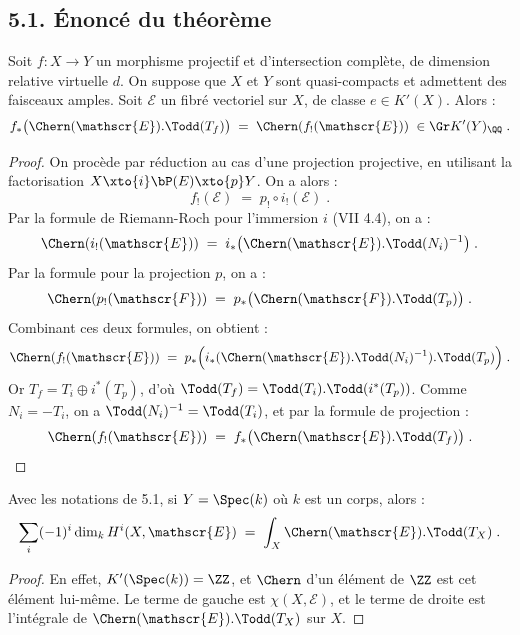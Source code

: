 \subsection*{5.1. Énoncé du théorème}

\begin{theoreme}[5.1]%
Soit $f : X \to Y$ un morphisme projectif et d'intersection complète, de dimension relative virtuelle $d$. On suppose que $X$ et $Y$ sont quasi-compacts et admettent des faisceaux amples. Soit $\mathscr{E}$ un fibré vectoriel sur $X$, de classe $e \in K'(X)$. Alors :
\[
f_*\bigl(\Chern(\mathscr{E}) . \Todd(T_f)\bigr) \; = \; \Chern(f_!(\mathscr{E}))\; \in \Gr K'(Y)_{\QQ}\; .
\]
\end{theoreme}

\begin{proof}
On procède par réduction au cas d'une projection projective, en utilisant la factorisation $X \xto{i} \bP(E) \xto{p} Y$. On a alors :
\[
f_!(\mathscr{E}) \; = \; p_! \circ i_!(\mathscr{E})\; .
\]
Par la formule de Riemann-Roch pour l'immersion $i$ (VII 4.4), on a :
\[
\Chern(i_!(\mathscr{E})) \; = \; i_*\bigl(\Chern(\mathscr{E}) . \Todd(N_i)^{-1}\bigr)\; .
\]
Par la formule pour la projection $p$, on a :
\[
\Chern(p_!(\mathscr{F})) \; = \; p_*\bigl(\Chern(\mathscr{F}) . \Todd(T_p)\bigr)\; .
\]
Combinant ces deux formules, on obtient :
\[
\Chern(f_!(\mathscr{E})) \; = \; p_*\Bigl(i_*(\Chern(\mathscr{E}) . \Todd(N_i)^{-1}) . \Todd(T_p)\Bigr)\; .
\]
Or $T_f = T_i \oplus i^*(T_p)$, d'où $\Todd(T_f) = \Todd(T_i) . \Todd(i^*(T_p))$. Comme $N_i = -T_i$, on a $\Todd(N_i)^{-1} = \Todd(T_i)$, et par la formule de projection :
\[
\Chern(f_!(\mathscr{E})) \; = \; f_*\bigl(\Chern(\mathscr{E}) . \Todd(T_f)\bigr)\; .
\]
\end{proof}

\begin{corollaire}[5.1]%
Avec les notations de 5.1, si $Y = \Spec(k)$ où $k$ est un corps, alors :
\[
\sum_{i} (-1)^i \dim_k H^i(X, \mathscr{E}) \; = \; \int_X \Chern(\mathscr{E}) . \Todd(T_X)\; .
\]
\end{corollaire}

\begin{proof}
En effet, $K'(\Spec(k)) = \ZZ$, et $\Chern$ d'un élément de $\ZZ$ est cet élément lui-même. Le terme de gauche est $\chi(X, \mathscr{E})$, et le terme de droite est l'intégrale de $\Chern(\mathscr{E}) . \Todd(T_X)$ sur $X$.
\end{proof}


